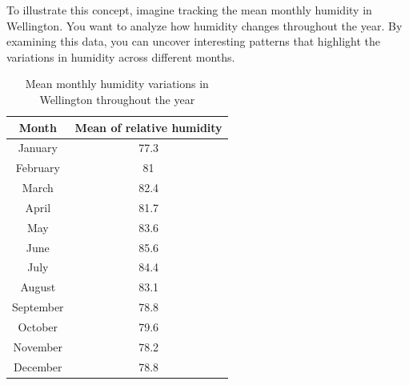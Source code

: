 
To illustrate this concept, imagine tracking the mean monthly humidity in Wellington. You want to analyze how humidity changes throughout the year. By examining this data, you can uncover interesting patterns that highlight the variations in humidity across different months. 



\begin{table}[ht]
	\caption{Mean monthly humidity variations in Wellington throughout the year} %
	\centering %
	\begin{tabular}{c c } %
		\hline\hline %
		Month & Mean of relative humidity \\ [0.5ex] %
		\hline %
		January & 77.3 \\ %
		February & 81 \\
		March & 82.4 \\
		April & 81.7 \\
		May & 83.6 \\ 
		June & 85.6 \\
		July & 84.4 \\
		August & 83.1 \\ 
		September & 78.8 \\
		October & 79.6 \\
		November & 78.2 \\
		December & 78.8 \\ [1ex] %
		\hline %
	\end{tabular}
	\label{table:nonlin} %
\end{table}


